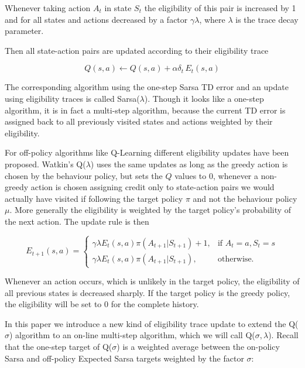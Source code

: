 \documentclass{article} %
\begin{document}
Whenever taking action $A_t$ in state $S_t$ the eligibility of this pair is increased by 1 and for all states and actions decreased by a factor $\gamma \lambda$, where $\lambda$ is the trace decay parameter. 

Then all state-action pairs are updated according to their eligibility trace

\begin{equation}
Q(s, a) \leftarrow Q(s, a) + \alpha \delta_t \, E_t(s, a) 
\end{equation}

The corresponding algorithm using the one-step Sarsa TD error and an update using eligibility traces is called Sarsa($\lambda$). Though it looks like a one-step algorithm, it is in fact a multi-step algorithm, because the current TD error is assigned back to all previously visited states and actions weighted by their eligibility. 

For off-policy algorithms like Q-Learning different eligibility updates have been proposed. Watkin's Q($\lambda$) uses the same updates as long as the greedy action is chosen by the behaviour policy, but sets the $Q$ values to 0, whenever a non-greedy action is chosen assigning credit only to state-action pairs we would actually have visited if following the target policy $\pi$ and not the behaviour policy $\mu$. More generally the eligibility is weighted by the target policy's probability of the next action. The update rule is then

\begin{equation}
    E_{t+1}(s, a) =
\begin{cases}
    \gamma \lambda E_t(s, a) \pi(A_{t+1} | S_{t+1}) + 1, & \text{if } A_t = a, S_t = s\\
    \gamma \lambda E_t(s, a) \pi(A_{t+1} | S_{t+1}),    & \text{otherwise.}
\end{cases}
\end{equation}

Whenever an action occurs, which is unlikely in the target policy, the eligibility of all previous states is decreased sharply. If the target policy is the greedy policy, the eligibility will be set to 0 for the complete history.

In this paper we introduce a new kind of eligibility trace update to extend the Q($\sigma$) algorithm to an on-line multi-step algorithm, which we will call Q($\sigma, \lambda$).
Recall that the one-step target of Q($\sigma$) is a weighted average between the on-policy Sarsa and off-policy Expected Sarsa targets weighted by the factor $\sigma$:
\end{document}
